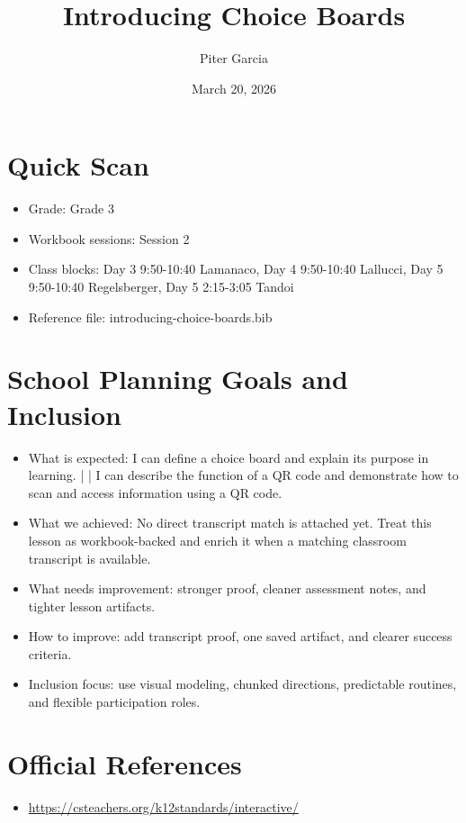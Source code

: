 \documentclass[11pt]{article}
\title{Introducing Choice Boards}
\author{Piter Garcia}
\date{March 20, 2026}
\begin{document}
\maketitle
\section*{Quick Scan}
\begin{itemize}[leftmargin=*]
\item Grade: Grade 3
\item Workbook sessions: Session 2
\item Class blocks: Day 3 9:50-10:40 Lamanaco, Day 4 9:50-10:40 Lallucci, Day 5 9:50-10:40 Regelsberger, Day 5 2:15-3:05 Tandoi
\item Reference file: introducing-choice-boards.bib
\end{itemize}
\section*{School Planning Goals and Inclusion}
\begin{itemize}[leftmargin=*]
\item What is expected: I can define a choice board and explain its purpose in learning. | | I can describe the function of a QR code and demonstrate how to scan and access information using a QR code.
\item What we achieved: No direct transcript match is attached yet. Treat this lesson as workbook-backed and enrich it when a matching classroom transcript is available.
\item What needs improvement: stronger proof, cleaner assessment notes, and tighter lesson artifacts.
\item How to improve: add transcript proof, one saved artifact, and clearer success criteria.
\item Inclusion focus: use visual modeling, chunked directions, predictable routines, and flexible participation roles.
\end{itemize}
\section*{Official References}
\begin{itemize}[leftmargin=*]
\item \url{https://csteachers.org/k12standards/interactive/}

\end{itemize}
\end{document}

